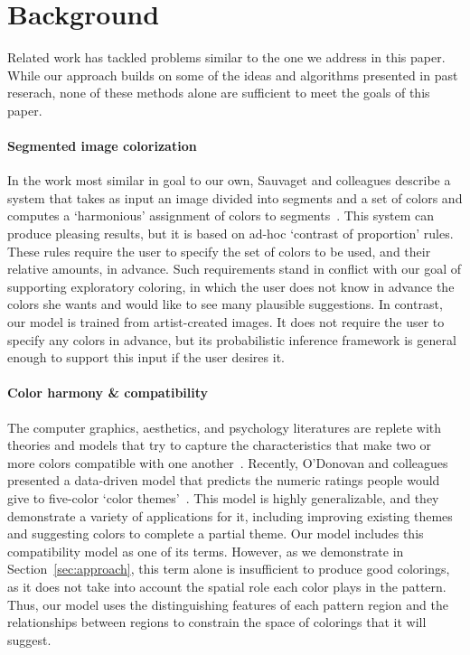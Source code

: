 \section{Background}
\label{sec:background}

Related work has tackled problems similar to the one we address in this paper. While our approach builds on some of the ideas and algorithms presented in past reserach, none of these methods alone are sufficient to meet the goals of this paper.

\paragraph{Segmented image colorization}
In the work most similar in goal to our own, Sauvaget and colleagues describe a system that takes as input an image divided into segments and a set of colors and computes a `harmonious' assignment of colors to segments~. This system can produce pleasing results, but it is based on ad-hoc `contrast of proportion' rules. These rules require the user to specify the set of colors to be used, and their relative amounts, in advance. Such requirements stand in conflict with our goal of supporting exploratory coloring, in which the user does not know in advance the colors she wants and would like to see many plausible suggestions. In contrast, our model is trained from artist-created images. It does not require the user to specify any colors in advance, but its probabilistic inference framework is general enough to support this input if the user desires it.

\paragraph{Color harmony \& compatibility}
The computer graphics, aesthetics, and psychology literatures are replete with theories and models that try to capture the characteristics that make two or more colors compatible with one another~\cite{CohenOrHarmonization,Munsell,PalmerColorPreference}. Recently, O'Donovan and colleagues presented a data-driven model that predicts the numeric ratings people would give to five-color `color themes'~. This model is highly generalizable, and they demonstrate a variety of applications for it, including improving existing themes and suggesting colors to complete a partial theme. Our model includes this compatibility model as one of its terms. However, as we demonstrate in Section~\ref{sec:approach}, this term alone is insufficient to produce good colorings, as it does not take into account the spatial role each color plays in the pattern. Thus, our model uses the distinguishing features of each pattern region and the relationships between regions to constrain the space of colorings that it will suggest.

